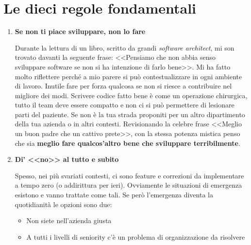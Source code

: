 \section{Le dieci regole fondamentali}



\begin{enumerate}

\item \textbf{Se non ti piace sviluppare, non lo fare}

Durante la lettura di un libro, scritto da grandi \emph{software architect}, mi son trovato davanti la seguente frase: <<Pensiamo che non abbia senso sviluppare software se non si ha intenzione di farlo bene>>. Mi ha fatto molto riflettere perché a mio parere si può contestualizzare in ogni ambiente di lavoro. Inutile fare per forza qualcosa se non si riesce a contribuire nel migliore dei modi. Scrivere codice fatto bene è come un operazione chirurgica, tutto il team deve essere compatto e non ci si può permettere di lesionare parti del paziente. Se non è la tua strada proponiti per un altro dipartimento della tua azienda o in altri contesti. Revisionando la celebre frase <<Meglio un buon padre che un cattivo prete>>, con la stessa potenza mistica penso che sia \textbf{meglio fare qualcos'altro bene che sviluppare terribilmente}.

\item \textbf{Di' <<no>> al tutto e subito}

Spesso, nei più svariati contesti, ci sono feature e correzioni da implementare a tempo zero (o addirittura per ieri). Ovviamente le situazioni di emergenza esistono e vanno trattate come tali. Se però l'emergenza diventa la quotidianità le opzioni sono due:
\begin{itemize}
\item Non siete nell'azienda giusta
\item A tutti i livelli di seniority c'è un problema di organizzazione da risolvere
\end{itemize}


\end{enumerate}
